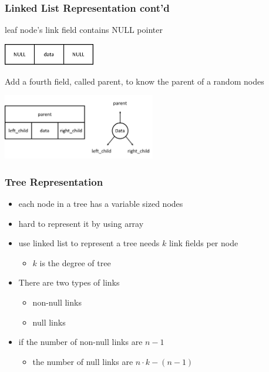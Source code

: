 \documentclass[newPxFont,sthlmFooter,nooffset]{beamer}
\begin{document}
\begin{frame}[t]
  \frametitle{Linked List Representation cont'd}
leaf node's link field contains NULL pointer

  \begin{center}
\vspace{-1em}
    \includegraphics[width=0.3\textwidth]{figures/fig08_linked_list2.png}
  \end{center}

Add a fourth field, called parent, to know the parent of a random nodes
  \begin{center}
\vspace{-1em}
    \includegraphics[width=0.5\textwidth]{figures/fig08_linked_list1.png}
  \end{center}

\end{frame}



\begin{frame}[t]
  \frametitle{Tree Representation}
  \begin{itemize}
  \item each node in a tree has a variable sized nodes
  \item hard to represent it by using array
  \item use linked list to represent a tree needs $k$ link fields per node
    \begin{itemize}
    \item  $k$ is the degree of tree
    \end{itemize}

  \item There are two types of links
    \begin{itemize}
    \item non-null links
    \item null links
    \end{itemize}
  \item if the number of non-null links are $n-1$
    \begin{itemize}
    \item the number of null links are $n \cdot k - (n-1)$
    \end{itemize}

  \end{itemize}
\end{frame}
\end{document}
